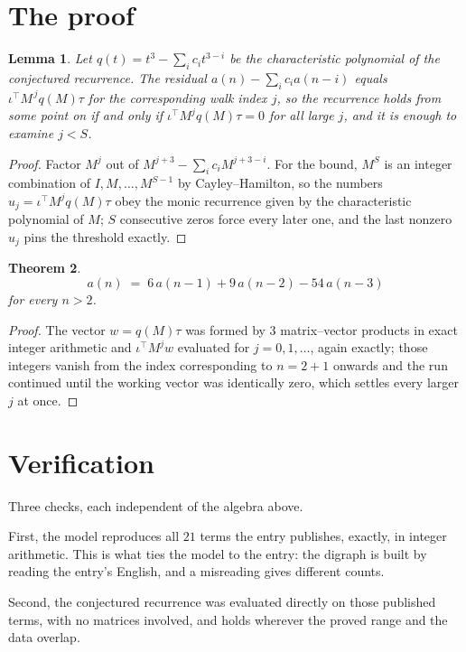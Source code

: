 \documentclass[11pt,a4paper]{article}
\theoremstyle{plain}
\newtheorem{theorem}{Theorem}
\newtheorem{lemma}[theorem]{Lemma}
\theoremstyle{definition}
\begin{document}
\section{The proof}

\begin{lemma}\label{lem:crit}
Let $q(t)=t^{3}-\sum_i c_it^{3-i}$ be the characteristic polynomial of the
conjectured recurrence. The residual $a(n)-\sum_ic_ia(n-i)$ equals
$\iota^{\!\top}M^{\,j}q(M)\tau$ for the corresponding walk index $j$, so the recurrence
holds from some point on if and only if $\iota^{\!\top}M^{j}q(M)\tau=0$ for all large $j$,
and it is enough to examine $j<S$.
\end{lemma}

\begin{proof}
Factor $M^{j}$ out of $M^{j+3}-\sum_ic_iM^{j+3-i}$. For the bound, $M^{S}$
is an integer combination of $I,M,\dots,M^{S-1}$ by Cayley--Hamilton, so the numbers
$u_j=\iota^{\!\top}M^{j}q(M)\tau$ obey the monic recurrence given by the characteristic
polynomial of $M$; $S$ consecutive zeros force every later one, and the last nonzero $u_j$
pins the threshold exactly.
\end{proof}

\begin{theorem}
\[
a(n)\;=\;6\,a(n-1) + 9\,a(n-2) - 54\,a(n-3)
\]
for every $n>2$.
\end{theorem}

\begin{proof}
The vector $w=q(M)\tau$ was formed by $3$ matrix--vector products in exact integer
arithmetic and $\iota^{\!\top}M^{j}w$ evaluated for $j=0,1,\dots$, again exactly; those
integers vanish from the index corresponding to $n=2+1$ onwards and the run continued
until the working vector was identically zero, which settles every larger $j$ at once.
\end{proof}

\section{Verification}

Three checks, each independent of the algebra above.

First, the model reproduces all $21$ terms the entry publishes, exactly, in integer
arithmetic. This is what ties the model to the entry: the digraph is built by reading the
entry's English, and a misreading gives different counts.

Second, the conjectured recurrence was evaluated directly on those published terms, with no
matrices involved, and holds wherever the proved range and the data overlap.
\end{document}
